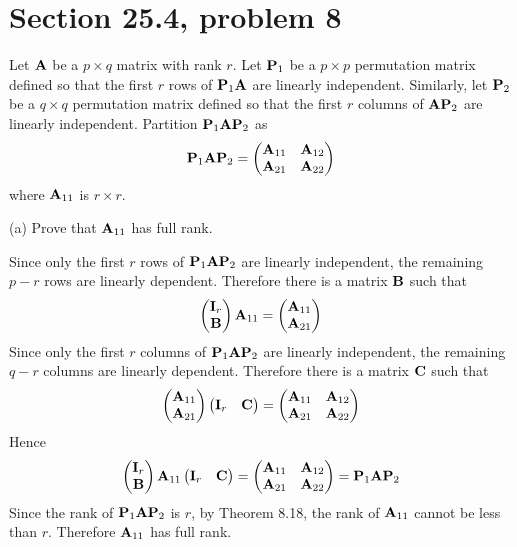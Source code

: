 \section{Section 25.4, problem 8}
Let $\bf A$ be a $p\times q$ matrix with rank $r$.
Let ${\bf P}_1$ be a $p\times p$ permutation matrix defined so
that the first $r$ rows of ${\bf P}_1{\bf A}$ are linearly
independent.
Similarly, let ${\bf P}_2$ be a $q\times q$ permutation matrix defined
so that the first $r$ columns of ${\bf AP}_2$ are linearly
independent.
Partition ${\bf P}_1{\bf AP}_2$ as
$${\bf P}_1{\bf AP}_2=\left(\begin{matrix}
{\bf A}_{11} & {\bf A}_{12}\cr
{\bf A}_{21} & {\bf A}_{22}
\end{matrix}\right)
$$
where ${\bf A}_{11}$ is $r\times r$.

\bigskip
\noindent
(a) Prove that ${\bf A}_{11}$ has full rank.

\bigskip
\noindent
Since only the first $r$ rows of ${\bf P}_1{\bf A}{\bf P}_2$
are linearly independent, the remaining $p-r$ rows are linearly dependent.
Therefore there is a matrix $\bf B$ such that
$$\left(\begin{matrix}
{\bf I}_r\cr
{\bf B}
\end{matrix}\right){\bf A}_{11}=\left(\begin{matrix}
{\bf A}_{11}\cr
{\bf A}_{21}
\end{matrix}\right)
$$
Since only the first $r$ columns of ${\bf P}_1{\bf A}{\bf P}_2$
are linearly independent, the remaining $q-r$ columns are
linearly dependent.
Therefore there is a matrix $\bf C$ such that
$$\left(\begin{matrix}
{\bf A}_{11}\cr
{\bf A}_{21}
\end{matrix}\right)
\left(\begin{matrix}
{\bf I}_r & {\bf C}
\end{matrix}\right)=\left(\begin{matrix}
{\bf A}_{11} & {\bf A}_{12}\cr
{\bf A}_{21} & {\bf A}_{22}
\end{matrix}\right)
$$
Hence
$$
\left(\begin{matrix}
{\bf I}_r\cr
{\bf B}
\end{matrix}\right){\bf A}_{11}
\left(\begin{matrix}
{\bf I}_r & {\bf C}
\end{matrix}\right)=\left(\begin{matrix}
{\bf A}_{11} & {\bf A}_{12}\cr
{\bf A}_{21} & {\bf A}_{22}
\end{matrix}\right)={\bf P}_1{\bf A}{\bf P}_2
$$
Since the rank of ${\bf P}_1{\bf A}{\bf P}_2$ is $r$,
by Theorem 8.18, the rank of ${\bf A}_{11}$ cannot be less than
$r$. Therefore ${\bf A}_{11}$ has full rank.

